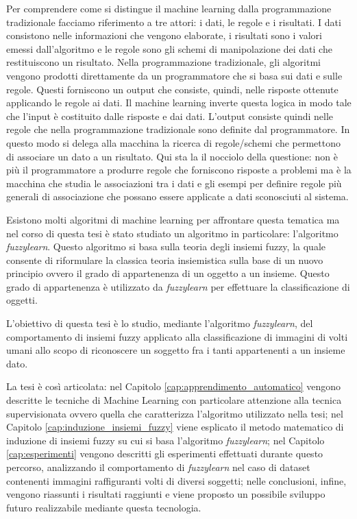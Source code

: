 \documentclass[12pt,italian]{report}
\begin{document}
Per comprendere come si distingue il machine learning dalla programmazione tradizionale facciamo riferimento a tre attori: i dati, le regole e i risultati. I dati consistono nelle informazioni che vengono elaborate, i risultati sono i valori emessi dall'algoritmo e le regole sono gli schemi di manipolazione dei dati che restituiscono un risultato.
Nella programmazione tradizionale, gli algoritmi vengono prodotti direttamente da un programmatore che si basa sui dati e sulle regole. Questi forniscono un output che consiste, quindi, nelle risposte ottenute applicando le regole ai dati. Il machine learning inverte questa logica in modo tale che l'input è costituito dalle risposte e dai dati. L'output consiste quindi nelle regole che nella programmazione tradizionale sono definite dal programmatore. In questo modo si delega alla macchina la ricerca di regole/schemi che permettono di associare un dato a un risultato. Qui sta la il nocciolo della questione: non è più il programmatore a produrre regole che forniscono risposte a problemi ma è la macchina che studia le associazioni tra i dati e gli esempi per definire regole più generali di associazione che possano essere applicate a dati sconosciuti al sistema.

Esistono molti algoritmi di machine learning per affrontare questa tematica ma nel corso di questa tesi è stato studiato un algoritmo in particolare: l'algoritmo \emph{fuzzylearn}. Questo algoritmo si basa sulla teoria degli insiemi fuzzy, la quale consente di riformulare la classica teoria insiemistica sulla base di un nuovo principio ovvero il grado di appartenenza di un oggetto a un insieme. Questo grado di appartenenza è utilizzato da \emph{fuzzylearn} per effettuare la classificazione di oggetti.

L'obiettivo di questa tesi è lo studio, mediante l'algoritmo \emph{fuzzylearn}, del comportamento di insiemi fuzzy applicato alla classificazione di immagini di volti umani allo scopo di riconoscere un soggetto fra i tanti appartenenti a un insieme dato.

La tesi è così articolata: nel Capitolo \ref{cap:apprendimento_automatico} vengono descritte le tecniche di Machine Learning con particolare attenzione alla tecnica supervisionata ovvero quella che caratterizza l'algoritmo utilizzato nella tesi; nel Capitolo \ref{cap:induzione_insiemi_fuzzy} viene esplicato il metodo matematico di induzione di insiemi fuzzy su cui si basa l'algoritmo \emph{fuzzylearn}; nel Capitolo \ref{cap:esperimenti} vengono descritti gli esperimenti effettuati durante questo percorso, analizzando il comportamento di \emph{fuzzylearn} nel caso di dataset contenenti immagini raffiguranti volti di diversi soggetti; nelle conclusioni, infine, vengono riassunti i risultati raggiunti e viene proposto un possibile sviluppo futuro realizzabile mediante questa tecnologia.
\end{document}
